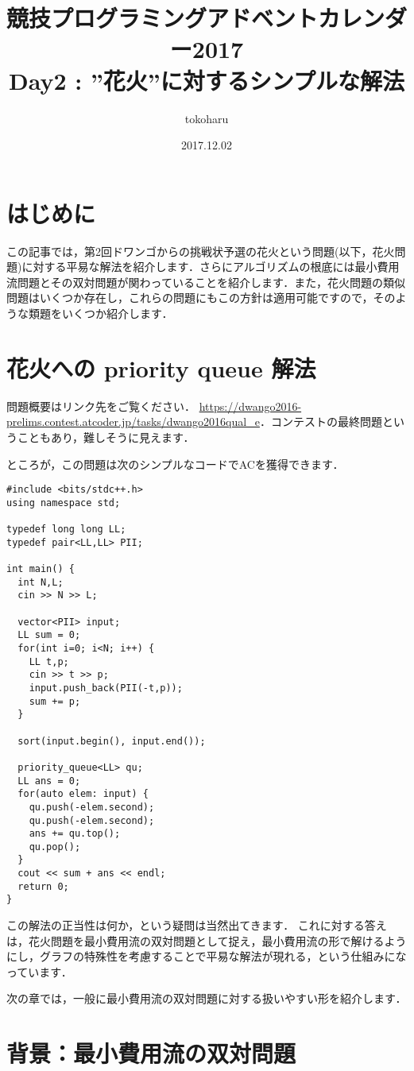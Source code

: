 \documentclass[13pt]{jarticle}
\title{競技プログラミングアドベントカレンダー2017\\
  Day2 : ”花火”に対するシンプルな解法}
\author{tokoharu}
\date {2017.12.02}
\theoremstyle{nonitalic} %
\begin{document}
\maketitle

\section{はじめに}
この記事では，第2回ドワンゴからの挑戦状予選の花火という問題(以下，花火問題)に対する平易な解法を紹介します．さらにアルゴリズムの根底には最小費用流問題とその双対問題が関わっていることを紹介します．また，花火問題の類似問題はいくつか存在し，これらの問題にもこの方針は適用可能ですので，そのような類題をいくつか紹介します．


\section{花火への priority queue 解法}
問題概要はリンク先をご覧ください． \url{https://dwango2016-prelims.contest.atcoder.jp/tasks/dwango2016qual_e}．コンテストの最終問題ということもあり，難しそうに見えます．

ところが，この問題は次のシンプルなコードでACを獲得できます．


\begin{lstlisting}[]
#include <bits/stdc++.h>
using namespace std;
 
typedef long long LL;
typedef pair<LL,LL> PII;
 
int main() {
  int N,L;
  cin >> N >> L;
  
  vector<PII> input;
  LL sum = 0;
  for(int i=0; i<N; i++) {
    LL t,p;
    cin >> t >> p;
    input.push_back(PII(-t,p));
    sum += p;
  }
  
  sort(input.begin(), input.end());
  
  priority_queue<LL> qu;
  LL ans = 0;
  for(auto elem: input) {
    qu.push(-elem.second);
    qu.push(-elem.second);
    ans += qu.top();
    qu.pop();
  }
  cout << sum + ans << endl;
  return 0;
}
\end{lstlisting}

この解法の正当性は何か，という疑問は当然出てきます．
これに対する答えは，花火問題を最小費用流の双対問題として捉え，最小費用流の形で解けるようにし，グラフの特殊性を考慮することで平易な解法が現れる，という仕組みになっています．

次の章では，一般に最小費用流の双対問題に対する扱いやすい形を紹介します．


\section{背景：最小費用流の双対問題}
\end{document}
